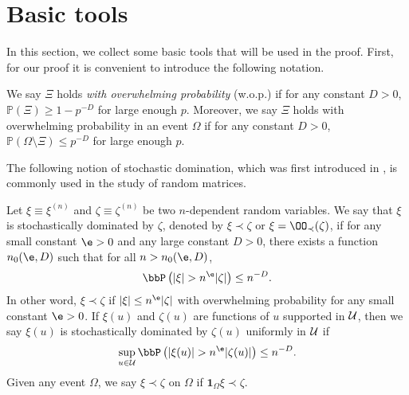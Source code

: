 \documentclass[aos,preprint]{imsart}
\begin{document}
\section{Basic tools}\label{app_tool}
 In this section, we collect some basic tools that will be used in the proof.
First, for our proof it is convenient to introduce the following notation.
\begin{definition}
 We say $\Xi$ holds \emph{with overwhelming probability} (w.o.p.) if for any constant $D>0$, $\mathbb P(\Xi)\ge 1- p^{-D}$ for large enough $p$. Moreover, we say $\Xi$ holds with overwhelming probability in an event $\Omega$ if for any constant $D>0$, $\mathbb P(\Omega\setminus \Xi)\le p^{-D}$ for large enough $p$.
\end{definition}

The following notion of stochastic domination, which was first introduced in \cite{Average_fluc}, is commonly used in the study of random matrices.

\begin{definition}\label{stoch_domination}
Let $\xi\equiv \xi^{(n)}$ and $\zeta\equiv \zeta^{(n)}$ be two $n$-dependent random variables.
We say that $\xi$ is stochastically dominated by $\zeta$, denoted by $\xi\prec \zeta$ or $\xi=\OO_\prec(\zeta)$, if for any small constant $\e > 0$ and any large constant $D > 0$, there exists a function $n_0(\e, D)$ such that for all $n > n_0(\e, D)$,
\[ \bbP\left(|\xi| >n^\e |\zeta|\right)\le n^{-D}. \]
In other word, $\xi\prec \zeta$ if $|\xi| \le n^\e |\zeta|$ with overwhelming probability for any small constant $\e>0$. If $\xi(u)$ and $\zeta(u)$ are functions of $u$ supported in $\cal U$, then we say $\xi(u)$ is stochastically dominated by $\zeta(u)$ uniformly in $\cal U$ if %
\[ \sup_{u\in \cal U}\bbP\left(|\xi(u)|>n^\e |\zeta(u)|\right)\le n^{-D}. \]
Given any event $\Omega$, we say $\xi \prec \zeta$ on $\Omega$ if $\mathbf 1_{\Omega}\xi \prec \zeta$.
\end{definition}
\end{document}

